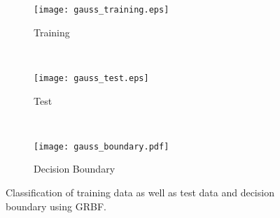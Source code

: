 \documentclass[a4paper,11pt]{article}
\theoremstyle{definition}
\theoremstyle{plain}
\theoremstyle{remark}
\begin{document}
\begin{figure}
\centering
\begin{subfigure}[b]{0.31\textwidth}
\centering
\texttt{[image: gauss\_training.eps]}
\caption{Training}
\end{subfigure}
~
\begin{subfigure}[b]{0.31\textwidth}
\centering
\texttt{[image: gauss\_test.eps]}
\caption{Test}
\end{subfigure}
~
\begin{subfigure}[b]{0.31\textwidth}
\centering
\texttt{[image: gauss\_boundary.pdf]}
\caption{Decision Boundary}
\end{subfigure}

\caption{Classification of training data as well as test data and decision boundary using GRBF.}
\label{fig:4.3}
\end{figure}
\end{document}

